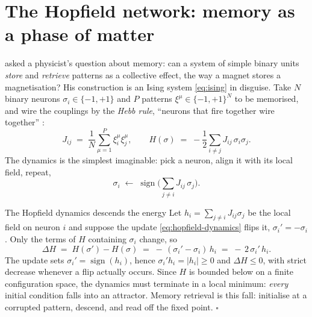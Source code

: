 \section{The Hopfield network: memory as a phase of matter}
\label{sec:hopfield}

\citet{hopfield1982neural} asked a physicist's question about memory: can
a system of simple binary units \emph{store} and \emph{retrieve} patterns
as a collective effect, the way a magnet stores a magnetisation? His
construction is an Ising system \eqref{eq:ising} in disguise. Take $N$
binary neurons $\sigma_i \in \{-1,+1\}$ and $P$ patterns
$\xi^\mu \in \{-1,+1\}^N$ to be memorised, and wire the couplings by the
\emph{Hebb rule}, ``neurons that fire together wire together''
\citep{hebb1949organization}:
\begin{equation}
  J_{ij} \;=\; \frac{1}{N} \sum_{\mu=1}^{P} \xi_i^\mu \xi_j^\mu ,
  \qquad
  H(\sigma) \;=\; -\frac{1}{2}\sum_{i \neq j} J_{ij}\, \sigma_i \sigma_j .
  \label{eq:hopfield}
\end{equation}
The dynamics is the simplest imaginable: pick a neuron, align it with its
local field, repeat,
\begin{equation}
  \sigma_i \;\leftarrow\; \operatorname{sign}\Big( \textstyle\sum_{j \neq i}
  J_{ij}\, \sigma_j \Big).
  \label{eq:hopfield-dynamics}
\end{equation}

\begin{toolbox}{The Hopfield dynamics descends the energy}
Let $h_i = \sum_{j \neq i} J_{ij} \sigma_j$ be the local field on neuron
$i$ and suppose the update \eqref{eq:hopfield-dynamics} flips it,
$\sigma_i' = -\sigma_i$. Only the terms of $H$ containing $\sigma_i$
change, so
\begin{equation*}
  \Delta H
  \;=\; H(\sigma') - H(\sigma)
  \;=\; -\,(\sigma_i' - \sigma_i)\, h_i
  \;=\; -\,2\,\sigma_i'\, h_i .
\end{equation*}
The update sets $\sigma_i' = \operatorname{sign}(h_i)$, hence
$\sigma_i' h_i = |h_i| \geq 0$ and $\Delta H \leq 0$, with strict
decrease whenever a flip actually occurs. Since $H$ is bounded below on a
finite configuration space, the dynamics must terminate in a local
minimum: \emph{every} initial condition falls into an attractor. Memory
retrieval is this fall: initialise at a corrupted pattern, descend, and
read off the fixed point. \hfill$\square$
\end{toolbox}

